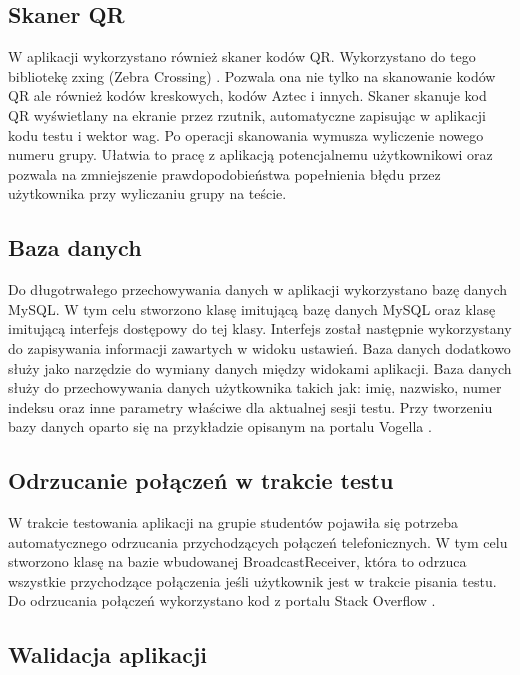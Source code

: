 \documentclass[eng]{mgr}
\begin{document}
			\subsection{Skaner QR}
			
			W aplikacji wykorzystano również skaner kodów QR. Wykorzystano do tego bibliotekę zxing (Zebra Crossing) \cite{zxing}. Pozwala ona nie tylko na skanowanie kodów QR ale również kodów kreskowych, kodów Aztec i innych. Skaner skanuje kod QR wyświetlany na ekranie przez rzutnik, automatyczne zapisując w aplikacji kodu testu i wektor wag. Po operacji skanowania wymusza wyliczenie nowego numeru grupy. Ułatwia to pracę z aplikacją potencjalnemu użytkownikowi oraz pozwala na zmniejszenie prawdopodobieństwa popełnienia błędu przez użytkownika przy wyliczaniu grupy na teście.
			
			\subsection{Baza danych}
			
			Do długotrwałego przechowywania danych w aplikacji wykorzystano bazę danych MySQL. W tym celu stworzono klasę imitującą bazę danych MySQL oraz klasę imitującą interfejs dostępowy do tej klasy. Interfejs został następnie wykorzystany do zapisywania informacji zawartych w widoku ustawień. Baza danych dodatkowo służy jako narzędzie do wymiany danych między widokami aplikacji. Baza danych służy do przechowywania danych użytkownika takich jak: imię, nazwisko, numer indeksu oraz inne parametry właściwe dla aktualnej sesji testu. Przy tworzeniu bazy danych oparto się na przykładzie opisanym na portalu Vogella \cite{sqlitedatabase}.
			
			\subsection{Odrzucanie połączeń w trakcie testu}
			
			W trakcie testowania aplikacji na grupie studentów pojawiła się potrzeba automatycznego odrzucania przychodzących połączeń telefonicznych. W tym celu stworzono klasę na bazie wbudowanej BroadcastReceiver, która to odrzuca wszystkie przychodzące połączenia jeśli użytkownik jest w trakcie pisania testu. Do odrzucania połączeń wykorzystano kod z portalu Stack Overflow \cite{callreject}.
			
			\subsection{Walidacja aplikacji}
			
\end{document}
